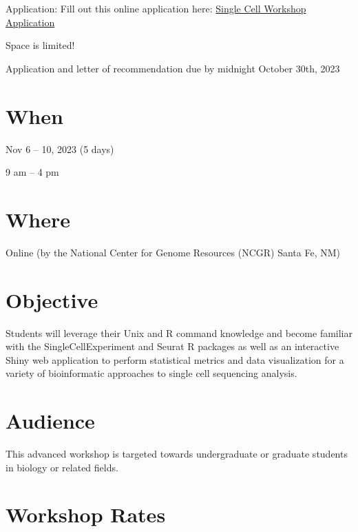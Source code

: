 \documentclass[
]{book}
\begin{document}
Application: Fill out this online application here: \href{https://docs.google.com/forms/d/e/1FAIpQLSfPdh4grpQd94_-kRvZ-NCZbd4RY2W7A31wnqkzwhKTdYZuxg/viewform}{Single Cell Workshop Application}

Space is limited!

Application and letter of recommendation due by midnight October 30th, 2023

\hypertarget{when-2}{%
\section*{When}\label{when-2}}

Nov 6 -- 10, 2023 (5 days)

9 am -- 4 pm

\hypertarget{where-1}{%
\section*{Where}\label{where-1}}

Online (by the National Center for Genome Resources (NCGR) Santa Fe, NM)

\hypertarget{objective-1}{%
\section*{Objective}\label{objective-1}}

Students will leverage their Unix and R command knowledge and become familiar with the SingleCellExperiment and Seurat R packages as well as an interactive Shiny web application to perform statistical metrics and data visualization for a variety of bioinformatic approaches to single cell sequencing analysis.

\hypertarget{audience-1}{%
\section*{Audience}\label{audience-1}}

This advanced workshop is targeted towards undergraduate or graduate students in biology or related fields.

\hypertarget{workshop-rates-1}{%
\section*{Workshop Rates}\label{workshop-rates-1}}
\end{document}
